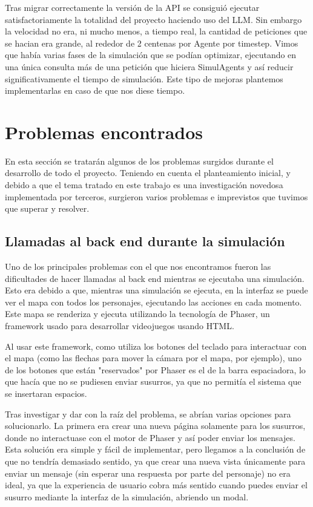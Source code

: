 Tras migrar correctamente la versión de la API se consiguió ejecutar satisfactoriamente la totalidad del proyecto haciendo uso del LLM. Sin embargo la velocidad no era, ni mucho menos, a tiempo real, la cantidad de peticiones que se hacian era grande, al rededor de 2 centenas por Agente por timestep. Vimos que había varias fases de la simulación que se podían optimizar, ejecutando en una única consulta más de una petición que hiciera SimulAgents y así reducir significativamente el tiempo de simulación. Este tipo de mejoras plantemos implementarlas en caso de que nos diese tiempo.

\section{Problemas encontrados}

En esta sección se tratarán algunos de los problemas surgidos durante el desarrollo de todo el proyecto. Teniendo en cuenta el planteamiento inicial, y debido a que el tema tratado en este trabajo es una investigación novedosa implementada por terceros, surgieron varios problemas e imprevistos que tuvimos que superar y resolver.

\subsection{Llamadas al back end durante la simulación}

Uno de los principales problemas con el que nos encontramos fueron las dificultades de hacer llamadas al back end mientras se ejecutaba una simulación. Esto era debido a que, mientras una simulación se ejecuta, en la interfaz se puede ver el mapa con todos los personajes, ejecutando las acciones en cada momento. Este mapa se renderiza y ejecuta utilizando la tecnología de Phaser, un framework usado para desarrollar videojuegos usando HTML.

Al usar este framework, como utiliza los botones del teclado para interactuar con el mapa (como las flechas para mover la cámara por el mapa, por ejemplo), uno de los botones que están "reservados" por Phaser es el de la barra espaciadora, lo que hacía que no se pudiesen enviar susurros, ya que no permitía el sistema que se insertaran espacios.

Tras investigar y dar con la raíz del problema, se abrían varias opciones para solucionarlo. La primera era crear una nueva página solamente para los susurros, donde no interactuase con el motor de Phaser y así poder enviar los mensajes. Esta solución era simple y fácil de implementar, pero llegamos a la conclusión de que no tendría demasiado sentido, ya que crear una nueva vista únicamente para enviar un mensaje (sin esperar una respuesta por parte del personaje) no era ideal, ya que la experiencia de usuario cobra más sentido cuando puedes enviar el susurro mediante la interfaz de la simulación, abriendo un modal.

